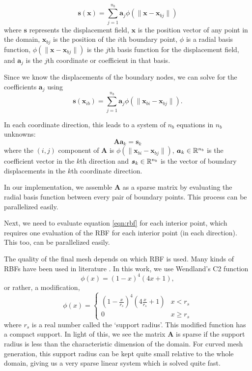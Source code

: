  \begin{equation}
 \mathbf{s}(\mathbf{x}) = \sum_{j=1}^{n_b} \mathbf{a}_j \phi(\lVert\mathbf{x} - \mathbf{x}_{bj}\rVert)
 \label{eqn:rbf}
 \end{equation}
 where $\mathbf{s}$ represents the displacement field, $\mathbf{x}$ is the position vector of any point in the domain, $\mathbf{x}_{bj}$ is the position of the $i$th boundary point, $\phi$ is a radial basis function, $\phi(\lVert\mathbf{x} - \mathbf{x}_{bj}\rVert)$ is the $j$th basis function for the displacement field, and $\mathbf{a}_j$ is the $j$th coordinate or coefficient in that basis.
 
 Since we know the displacements of the boundary nodes, we can solve for the coefficients $\mathbf{a}_j$ using
 \begin{equation}
 \mathbf{s}(\mathbf{x}_{ib}) = \sum_{j=1}^{n_b} \mathbf{a}_j \phi(\lVert\mathbf{x}_{bi} - \mathbf{x}_{bj}\rVert).
 \end{equation}
 
 In each coordinate direction, this leads to a system of $n_b$ equations in $n_b$ unknowns:
 \begin{equation}
 \mathbf{A}\mathbf{a}_k = \mathbf{s}_k
 \end{equation}
 where the $(i,j)$ component of $\mathbf{A}$ is $\phi(\lVert\mathbf{x}_{bi} - \mathbf{x}_{bj} \rVert)$, $ \boldsymbol{a}_k \in \mathbb{R}^{n_b}$ is the coefficient vector in the $k$th direction and $\boldsymbol{s}_k \in \mathbb{R}^{n_b}$ is the vector of boundary displacements in the $k$th coordinate direction.
 
 In our implementation, we assemble $\mathbf{A}$ as a sparse matrix by evaluating the radial basis function between every pair of boundary points. This process can be parallelized easily.
 
 Next, we need to evaluate equation \eqref{eqn:rbf} for each interior point, which requires one evaluation of the RBF for each interior point (in each direction). This too, can be parallelized easily.
 
 The quality of the final mesh depends on which RBF is used. Many kinds of RBFs have been used in literature \cite{mm:rbf, mm:rbf2}. In this work, we use Wendland's C2 function
 \begin{equation}
 \phi(x) = (1-x)^4(4x + 1),
 \end{equation}
 or rather, a modification,
 \begin{equation}
 \phi(x) = 
 \begin{cases}
 \left(1-\frac{x}{r_s}\right)^4\left(4\frac{x}{r_s} + 1\right) & x < r_s \\
 0 & x \geq r_s
 \end{cases}
 \end{equation}
 where $r_s$ is a real number called the `support radius'. This modified function has a compact support. In light of this, we see the matrix $\mathbf{A}$ is sparse if the support radius is less than the characteristic dimension of the domain. For curved mesh generation, this support radius can be kept quite small relative to the whole domain, giving us a very sparse linear system which is solved quite fast.
 
